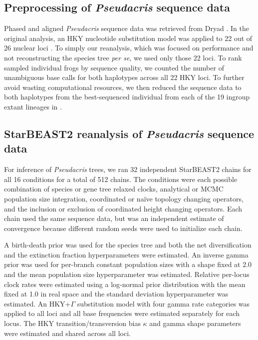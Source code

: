\documentclass[12pt]{article}
\begin{document}
\subsection*{Preprocessing of \textit{Pseudacris} sequence data}

Phased and aligned \textit{Pseudacris} sequence data was retrieved from Dryad
\citep{dryad_23rc0}. In the original analysis, an HKY nucleotide substitution
model was applied to 22 out of 26 nuclear loci \citep{Barrow201478}. To simply
our reanalysis, which was focused on performance and not reconstructing the
species tree \textit{per se}, we used only those 22 loci. To rank sampled
individual frogs by sequence quality, we counted the number of unambiguous base
calls for both haplotypes across all 22 HKY loci. To further avoid wasting
computational resources, we then reduced the sequence data to both haplotypes
from the best-sequenced individual from each of the 19 ingroup extant lineages
in \cite{Barrow201478}.

\subsection*{StarBEAST2 reanalysis of \textit{Pseudacris} sequence data}

For inference of \textit{Pseudacris} trees, we ran 32 independent StarBEAST2
chains for all 16 conditions for a total of 512 chains. The conditions were each
possible combination of species or gene tree relaxed clocks, analytical or
MCMC population size integration, coordinated or na\"ive topology changing
operators, and the inclusion or exclusion of coordinated height changing
operators. Each chain used the same sequence data, but was an independent
estimate of convergence because different random seeds were used to initialize
each chain.

A birth-death prior was used for the species tree and both the net diversification
and the extinction fraction hyperparameters were estimated. An inverse gamma prior was
used for per-branch constant population sizes with a shape fixed at 2.0 and the
mean population size hyperparameter was estimated. Relative per-locus clock
rates were estimated using a log-normal prior distribution with the mean fixed
at 1.0 in real space and the standard deviation hyperparameter was estimated. An
HKY+$\Gamma$ substitution model with four gamma rate categories was applied to
all loci and all base frequencies were estimated separately for each locus. The
HKY transition/transversion bias $\kappa$ and gamma shape parameters were estimated and shared across all loci.
\end{document}

